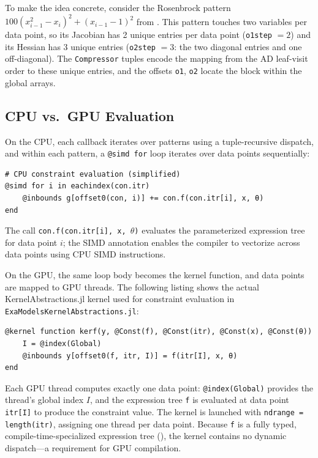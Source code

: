 \documentclass[11pt]{article}
\begin{document}
To make the idea concrete, consider the Rosenbrock pattern $100(x_{i-1}^2 - x_i)^2 + (x_{i-1} - 1)^2$ from . This pattern touches two variables per data point, so its Jacobian has 2 unique entries per data point (\texttt{o1step} $= 2$) and its Hessian has 3 unique entries (\texttt{o2step} $= 3$: the two diagonal entries and one off-diagonal). The \texttt{Compressor} tuples encode the mapping from the AD leaf-visit order to these unique entries, and the offsets \texttt{o1}, \texttt{o2} locate the block within the global arrays.

\subsection{CPU vs.\ GPU Evaluation}
\label{sec:gpu:cpugpu}

On the CPU, each callback iterates over patterns using a tuple-recursive dispatch, and within each pattern, a \texttt{@simd for} loop iterates over data points sequentially:
\begin{lstlisting}
# CPU constraint evaluation (simplified)
@simd for i in eachindex(con.itr)
    @inbounds g[offset0(con, i)] += con.f(con.itr[i], x, θ)
end
\end{lstlisting}
The call \texttt{con.f(con.itr[i], x, $\theta$)} evaluates the parameterized expression tree for data point $i$; the SIMD annotation enables the compiler to vectorize across data points using CPU SIMD instructions.

On the GPU, the same loop body becomes the kernel function, and data points are mapped to GPU threads. The following listing shows the actual KernelAbstractions.jl kernel used for constraint evaluation in \texttt{ExaModelsKernelAbstractions.jl}:
\begin{lstlisting}
@kernel function kerf(y, @Const(f), @Const(itr), @Const(x), @Const(θ))
    I = @index(Global)
    @inbounds y[offset0(f, itr, I)] = f(itr[I], x, θ)
end
\end{lstlisting}
Each GPU thread computes exactly one data point: \texttt{@index(Global)} provides the thread's global index $I$, and the expression tree \texttt{f} is evaluated at data point \texttt{itr[I]} to produce the constraint value. The kernel is launched with \texttt{ndrange = length(itr)}, assigning one thread per data point. Because \texttt{f} is a fully typed, compile-time-specialized expression tree (), the kernel contains no dynamic dispatch---a requirement for GPU compilation.
\end{document}
